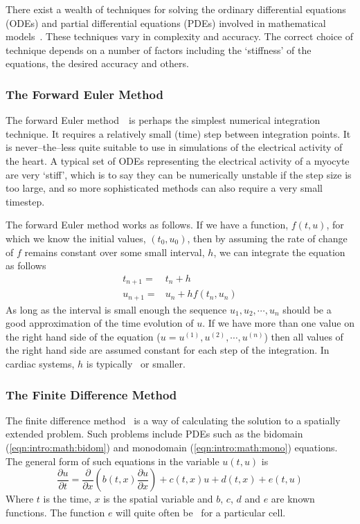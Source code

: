 There exist a wealth of techniques for solving the ordinary differential
equations (ODEs) and partial differential equations (PDEs) involved in
mathematical models~\cite{Sundnes2006}.
These techniques vary in complexity and accuracy.
The correct choice of technique depends on a number of factors including the
`stiffness' of the equations, the desired accuracy and others.

\subsubsection{The Forward Euler Method}

The forward Euler method~\cite{Birkhoff1989}\ is perhaps the simplest numerical
integration technique.
It requires a relatively small (time) step between integration points.
It is never--the--less quite suitable to use in simulations of the electrical
activity of the heart.
A typical set of ODEs representing the electrical activity of a myocyte are very
`stiff', which is to say they can be numerically unstable if the step size is
too large, and so more sophisticated methods can also require a very small
timestep.

The forward Euler method works as follows.
If we have a function, $f(t, u)$, for which we know the initial
values, $(t_0, u_0)$, then by assuming the rate of change of $f$ remains constant
over some small interval, $h$, we can integrate the equation as follows
\begin{subequations}
\label{eqn:intro:euler}
\begin{align}
t_{n+1} = & t_n + h \label{eqn:intro:euler:t} \\
u_{n+1} = & u_n + hf(t_n, u_n) \label{eqn:intro:euler:x}
\end{align}
\end{subequations}
As long as the interval is small enough the sequence $u_1,u_2,\cdots,u_n$
should be a good approximation of the time evolution of $u$.
If we have more than one value on the right hand side of the equation ($u =
u^{(1)}, u^{(2)}, \cdots, u^{(n)}$) then all values of the right hand side are
assumed constant for each step of the integration.
In cardiac systems, $h$ is typically \ or smaller.

\subsubsection{The Finite Difference Method}

The finite difference method~\cite{Morton2005} is a way of calculating the
solution to a spatially extended problem.
Such problems include PDEs such as the bidomain (\ref{eqn:intro:math:bidom}) and
monodomain (\ref{eqn:intro:math:mono}) equations.
The general form of such equations in the variable $u(t, u)$ is
\begin{equation}
\label{eqn:intro:fd:partial}
\frac{\partial u}{\partial t} = \frac{\partial}{\partial x} \left( b(t, x)
\frac{\partial u}{\partial x} \right) + c(t, x)u + d(t, x) + e(t, u)
\end{equation}
Where $t$ is the time, $x$ is the spatial variable and $b$, $c$, $d$ and $e$ are
known functions.
The function $e$ will quite often be \ for a particular cell.

